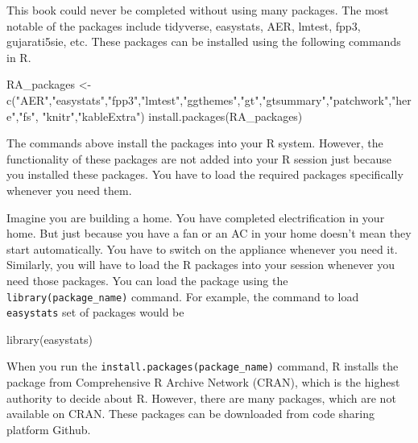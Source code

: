 \documentclass[
  letterpaper,
  paper =a4,
  twoside,
  openright,
  headsepline,
  footsepline,
  listof = totocnumbered,
  chapterprefix = true,
  firstiscover]{scrbook}
\newenvironment{Shaded}{\begin{snugshade}}{\end{snugshade}}
\newcommand{\FunctionTok}[1]{\textcolor[rgb]{0.28,0.35,0.67}{#1}}
\newcommand{\NormalTok}[1]{\textcolor[rgb]{0.00,0.23,0.31}{#1}}
\newcommand{\OtherTok}[1]{\textcolor[rgb]{0.00,0.23,0.31}{#1}}
\newcommand{\StringTok}[1]{\textcolor[rgb]{0.13,0.47,0.30}{#1}}
\begin{document}
\setcounter{figure}{0} 
\renewcommand{\thefigure}{A.\arabic{figure}}
\setcounter{table}{0} 
\renewcommand{\thetable}{A.\arabic{table}}

This book could never be completed without using many packages. The most
notable of the packages include tidyverse, easystats, AER, lmtest, fpp3,
gujarati5sie, etc. These packages can be installed using the following
commands in R.

\begin{Shaded}
\begin{Highlighting}[numbers=left,,]
\NormalTok{RA\_packages }\OtherTok{\textless{}{-}} \FunctionTok{c}\NormalTok{(}\StringTok{"AER"}\NormalTok{,}\StringTok{"easystats"}\NormalTok{,}\StringTok{"fpp3"}\NormalTok{,}\StringTok{"lmtest"}\NormalTok{,}\StringTok{"ggthemes"}\NormalTok{,}\StringTok{"gt"}\NormalTok{,}\StringTok{"gtsummary"}\NormalTok{,}\StringTok{"patchwork"}\NormalTok{,}\StringTok{"here"}\NormalTok{,}\StringTok{"fs"}\NormalTok{, }\StringTok{"knitr"}\NormalTok{,}\StringTok{"kableExtra"}\NormalTok{)}
\FunctionTok{install.packages}\NormalTok{(RA\_packages)}
\end{Highlighting}
\end{Shaded}

The commands above install the packages into your R system. However, the
functionality of these packages are not added into your R session just
because you installed these packages. You have to load the required
packages specifically whenever you need them.

Imagine you are building a home. You have completed electrification in
your home. But just because you have a fan or an AC in your home doesn't
mean they start automatically. You have to switch on the appliance
whenever you need it. Similarly, you will have to load the R packages
into your session whenever you need those packages. You can load the
package using the \texttt{library(package\_name)} command. For example,
the command to load \texttt{easystats} set of packages would be

\begin{Shaded}
\begin{Highlighting}[numbers=left,,]
\FunctionTok{library}\NormalTok{(easystats)}
\end{Highlighting}
\end{Shaded}

When you run the \texttt{install.packages(package\_name)} command, R
installs the package from Comprehensive R Archive Network (CRAN), which
is the highest authority to decide about R. However, there are many
packages, which are not available on CRAN. These packages can be
downloaded from code sharing platform Github.
\end{document}
